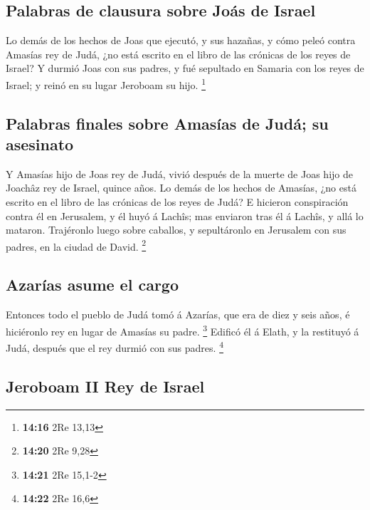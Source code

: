 \hypertarget{palabras-de-clausura-sobre-jouxe1s-de-israel}{%
\subsection{Palabras de clausura sobre Joás de
Israel}\label{palabras-de-clausura-sobre-jouxe1s-de-israel}}

 Lo demás de los hechos de Joas que ejecutó, y sus
hazañas, y cómo peleó contra Amasías rey de Judá, ¿no está escrito en el
libro de las crónicas de los reyes de Israel?  Y durmió
Joas con sus padres, y fué sepultado en Samaria con los reyes de Israel;
y reinó en su lugar Jeroboam su hijo. \footnote{\textbf{14:16} 2Re 13,13}

\hypertarget{palabras-finales-sobre-amasuxedas-de-juduxe1-su-asesinato}{%
\subsection{Palabras finales sobre Amasías de Judá; su
asesinato}\label{palabras-finales-sobre-amasuxedas-de-juduxe1-su-asesinato}}

 Y Amasías hijo de Joas rey de Judá, vivió después de la
muerte de Joas hijo de Joachâz rey de Israel, quince años.
 Lo demás de los hechos de Amasías, ¿no está escrito en
el libro de las crónicas de los reyes de Judá?  E
hicieron conspiración contra él en Jerusalem, y él huyó á Lachîs; mas
enviaron tras él á Lachîs, y allá lo mataron.  Trajéronlo
luego sobre caballos, y sepultáronlo en Jerusalem con sus padres, en la
ciudad de David. \footnote{\textbf{14:20} 2Re 9,28}

\hypertarget{azaruxedas-asume-el-cargo}{%
\subsection{Azarías asume el cargo}\label{azaruxedas-asume-el-cargo}}

 Entonces todo el pueblo de Judá tomó á Azarías, que era
de diez y seis años, é hiciéronlo rey en lugar de Amasías su padre.
\footnote{\textbf{14:21} 2Re 15,1-2}  Edificó él á Elath,
y la restituyó á Judá, después que el rey durmió con sus padres.
\footnote{\textbf{14:22} 2Re 16,6}

\hypertarget{jeroboam-ii-rey-de-israel}{%
\subsection{Jeroboam II Rey de Israel}\label{jeroboam-ii-rey-de-israel}}

